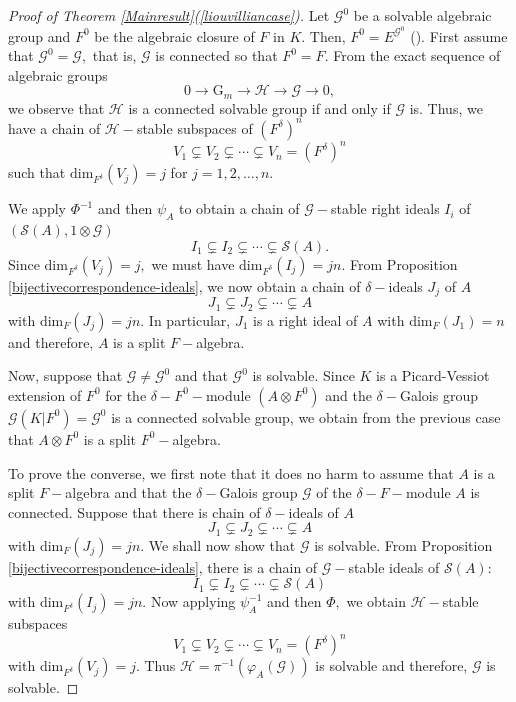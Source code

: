 \documentclass[preprint, 11pt]{amsart}
\theoremstyle{corollary}
\theoremstyle{remark}
\theoremstyle{proposition}
\numberwithin{equation}{subsection}
\begin{document}
	\begin{proof}[Proof of Theorem \ref{Mainresult}(\ref{liouvilliancase})]   Let $\mathscr G^0$ be a solvable algebraic group and $F^0$ be the algebraic closure of $F$ in $K.$ Then, $F^0=E^{\mathscr G^0}$ (\cite[Proposition 1.34]{MvdP03}).   First assume that $\mathscr{G}^0=\mathscr{G},$ that is, $\mathscr G$ is connected so that $F^0=F.$   From the exact sequence of algebraic groups $$0\to \mathrm{G}_m\to \mathscr H\to \mathscr G\to 0,$$ we observe that $\mathscr H$ is a connected solvable group if and only if $\mathscr G$ is. Thus, we have a chain of $\mathscr H-$stable subspaces of $(F^{\delta})^ n$ $$V_1\subsetneq V_2\subsetneq\cdots\subsetneq V_n=(F^{\delta})^n$$  
such that $\mathrm{dim}_{F^\delta}(V_j)=j$ for $j=1,2,\dots, n.$  
	
	 We apply $\Phi^{-1}$ and then $\psi_A$  to obtain a chain of $\mathscr{G}-$stable right ideals $I_i$ of $(\mathscr S(A), 1\otimes \mathscr G)$ $$I_1\subsetneq I_2\subsetneq\cdots\subsetneq \mathscr S(A).$$
	Since $\mathrm{dim}_{F^\delta}(V_j)=j,$ we must have  $\mathrm{dim}_{F^\delta}(I_j)=jn.$ From Proposition \ref{bijectivecorrespondence-ideals}, we now obtain a chain of  $\delta-$ideals $J_j$ of $A$ $$J_1\subsetneq J_2\subsetneq\cdots\subsetneq A$$
	with  $\mathrm{dim}_F(J_j)=jn.$  In particular, $J_1$ is a right ideal of $A$ with $\mathrm{dim}_F(J_1)=n$  and therefore, $A$ is a split $F-$algebra.
	
	Now, suppose that $\mathscr G\neq \mathscr{G}^0$ and that $\mathscr G^0$ is solvable. Since $K$ is a Picard-Vessiot extension of $F^0$ for the  $\delta-{F^0}-$module $(A\otimes F^0)$ and the $\delta-$Galois group $\mathscr{G}(K|F^0)=\mathscr{G}^0$ is a connected solvable group, we obtain from the previous case that $A\otimes F^0$ is a split $F^0-$algebra.
	
	To prove the converse, we first note that it does no harm to assume that $A$ is a split $F-$algebra and that the $\delta-$Galois group $\mathscr G$ of the $\delta-F-$module $A$ is connected. Suppose that there is chain of $\delta-$ideals of $A$ $$J_1\subsetneq J_2\subsetneq\cdots\subsetneq A$$ with $\mathrm{dim}_F(J_j)=jn.$ We shall now show that $\mathscr G$ is solvable. From Proposition \ref{bijectivecorrespondence-ideals}, there is a chain of $\mathscr{G}-$stable ideals of $\mathscr S (A):$ $$I_1\subsetneq I_2\subsetneq\cdots\subsetneq \mathscr S(A)$$
	with  $\mathrm{dim}_{F^\delta}(I_j)=jn.$ Now applying $\psi^{-1}_A$ and then $\Phi,$ we obtain $\mathscr H-$stable subspaces $$V_1\subsetneq V_2\subsetneq\cdots\subsetneq V_n=(F^{\delta})^n$$ with $\mathrm{dim}_{F^\delta}(V_j)=j.$ Thus $\mathscr H=\pi^{-1}(\varphi_A(\mathscr{G}))$ is solvable  and therefore, $\mathscr G$ is solvable.
\end{proof}
\end{document}
